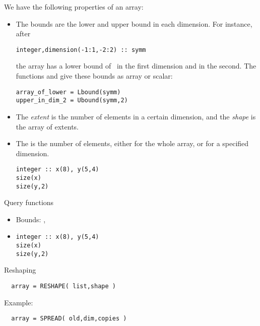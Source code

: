 We have the following properties of an array:
\begin{itemize}
\item The bounds are the lower and upper bound in each dimension.
  For instance, after
\begin{verbatim}
integer,dimension(-1:1,-2:2) :: symm
\end{verbatim}
the array  has a lower bound of~ in the first dimension
and  in the second. The functions  and
 give these bounds as array or scalar:
\begin{verbatim}
array_of_lower = Lbound(symm)
upper_in_dim_2 = Ubound(symm,2)
\end{verbatim}


\item The \emph{extent} is the number
  of elements in a certain dimension, and the
  \emph{shape} is the array of extents.

\item The  is the number of elements, either for
  the whole array, or for a specified dimension.
\begin{verbatim}
integer :: x(8), y(5,4)
size(x)
size(y,2)
\end{verbatim}
\end{itemize}

\begin{slide}{Query functions}
  \label{sl:farray-query}
    \begin{itemize}
    \item Bounds: , 
    \item {}
\begin{verbatim}
integer :: x(8), y(5,4)
size(x)
size(y,2)
\end{verbatim}
    \end{itemize}
\end{slide}

 {Reshaping}

\begin{verbatim}
  array = RESHAPE( list,shape )
\end{verbatim}
Example:

\begin{verbatim}
  array = SPREAD( old,dim,copies )
\end{verbatim}

